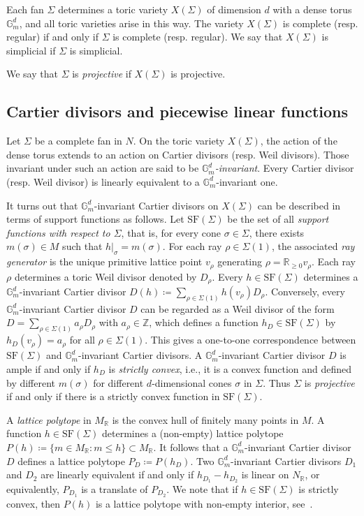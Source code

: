 \documentclass[11pt,a4paper]{article}
\theoremstyle{plain}
\theoremstyle{remark}
\theoremstyle{custombold}
\begin{document}
Each fan $\Sigma$ determines a toric variety $X(\Sigma)$ of dimension $d$ with a dense torus $\mathbb G_m^d$, and all toric varieties arise in this way. The variety $X(\Sigma)$ is complete (resp. regular) if and only if $\Sigma$ is complete (resp. regular). We say that $X(\Sigma)$ is simplicial if $\Sigma$ is simplicial.
   
   We say that $\Sigma$ is \emph{projective} if $X(\Sigma)$ is projective.
\subsection{Cartier divisors and piecewise linear functions} 

Let $\Sigma$ be a complete fan in $N$. On the toric variety $X(\Sigma)$, the action of the dense torus extends to an action on Cartier divisors (resp. Weil divisors). Those invariant under such an action are said to be \emph{$\mathbb G_m^d$-invariant}. Every Cartier divisor (resp. Weil divisor) is linearly equivalent to a $\mathbb G_m^d$-invariant one.

It turns out that $\mathbb G_m^d$-invariant Cartier divisors on $X(\Sigma)$ can be described in terms of support functions as follows. Let $\mathrm{SF}(\Sigma)$ be the set of all \emph{support functions with respect to $\Sigma$}, that is, for every cone $\sigma\in\Sigma$, there exists $m(\sigma)\in M$ such that $h|_\sigma=m(\sigma)$.  For each ray $\rho\in\Sigma(1)$, the associated \emph{ray generator} is the unique primitive lattice point $v_\rho$ generating  $\rho=\mathbb R_{\geq0}v_\rho$. Each ray $\rho$ determines a toric Weil divisor denoted by $D_\rho$. Every $h\in\mathrm{SF}(\Sigma)$ determines a $\mathbb G_m^d$-invariant Cartier divisor $D(h)\coloneqq \sum_{\rho\in \Sigma(1)}h(v_\rho)D_\rho$. Conversely, every $\mathbb G_m^d$-invariant Cartier divisor $D$ can be regarded as a Weil divisor of the form $D=\sum_{\rho\in\Sigma(1)} a_\rho D_\rho$ with $a_\rho\in\mathbb Z$, which defines a function $h_D\in\mathrm{SF}(\Sigma)$ by $h_D(v_\rho)=a_\rho$ for all $\rho\in\Sigma(1)$. This gives a one-to-one correspondence between $\mathrm{SF}(\Sigma)$ and  $\mathbb G_m^d$-invariant Cartier divisors. A $\mathbb G_m^d$-invariant Cartier divisor $D$ is ample if and only if $h_D$ is \emph{strictly convex}, i.e., it is a convex function and defined by different $m(\sigma)$ for different $d$-dimensional cones $\sigma$ in $\Sigma$. Thus $\Sigma$ is \emph{projective} if and only if there is a strictly convex function in $\mathrm{SF}(\Sigma)$.
 
A \emph{lattice polytope} in $M_\mathbb R$ is the convex hull of finitely many points in $M$. A function $h\in \mathrm{SF}(\Sigma)$ determines a  (non-empty) lattice polytope  $P(h)\coloneqq \{m\in M_\mathbb R:m\leq h\}\subset M_\mathbb R$. It follows that a $\mathbb G_m^d$-invariant Cartier divisor $D$  defines a lattice polytope $P_D\coloneqq P(h_D)$. Two  $\mathbb G_m^d$-invariant Cartier divisors $D_1$ and $D_2$ are linearly equivalent if and only if $h_{D_1}-h_{D_2}$ is linear on $N_\mathbb R$,  or equivalently, $P_{D_1}$ is a translate of $P_{D_2}$. We note that if $h\in \mathrm{SF}(\Sigma)$ is strictly convex, then $P(h)$ is a lattice polytope with non-empty
interior, see~\cite[Lemma~1.7.12]{Schneider-book-2013}. 
\end{document}
